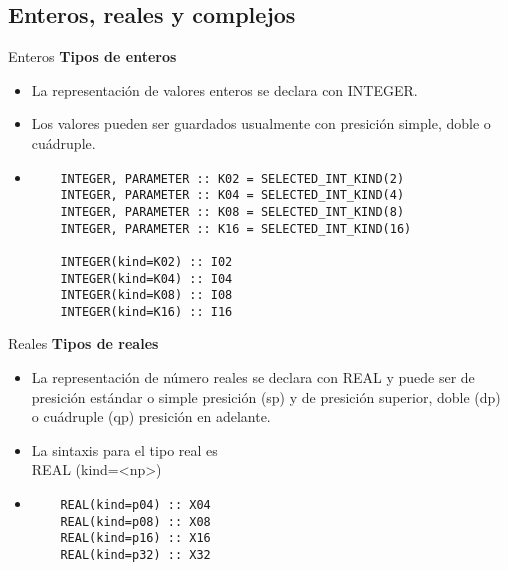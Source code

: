 
\subsection{Enteros, reales y complejos}

\begin{frame}[fragile]{Enteros}
\textbf{Tipos de enteros}
 \begin{itemize}[<+(1)->]
  \item La representación de valores enteros se declara con INTEGER.
  \item Los valores pueden ser guardados usualmente con presición simple, doble o cuádruple.  
  \vspace{0.2cm}
  \item []
   \begin{verbatim} 
    INTEGER, PARAMETER :: K02 = SELECTED_INT_KIND(2)
    INTEGER, PARAMETER :: K04 = SELECTED_INT_KIND(4)
    INTEGER, PARAMETER :: K08 = SELECTED_INT_KIND(8)
    INTEGER, PARAMETER :: K16 = SELECTED_INT_KIND(16)

    INTEGER(kind=K02) :: I02
    INTEGER(kind=K04) :: I04
    INTEGER(kind=K08) :: I08
    INTEGER(kind=K16) :: I16
   \end{verbatim}
 \end{itemize}
\end{frame}

\begin{frame}[fragile]{Reales}
\textbf{Tipos de reales}
 \begin{itemize}[<+(1)->]
  \item La representación de número reales se declara con REAL y puede ser de presición estándar o simple presición (sp) y de presición superior, doble (dp) o cuádruple (qp) presición en adelante.
  \item La sintaxis para el tipo real es\\ 
   \centering REAL (kind=<np>)
  \vspace{0.2cm}
  \item []
   \begin{verbatim}
    REAL(kind=p04) :: X04
    REAL(kind=p08) :: X08
    REAL(kind=p16) :: X16
    REAL(kind=p32) :: X32
   \end{verbatim}
 \end{itemize}
\end{frame}


